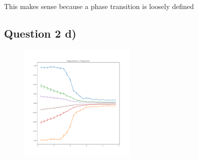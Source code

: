\documentclass[a4paper, twocolumn]{article}
\begin{document}
This makes sense because a phase transition is loosely defined %



\subsection*{Question 2 d)}
\begin{figure}
    \centering
    \includegraphics[width=0.5\textwidth]{pub/figures/magnetisation_ising_2d.pdf}
    \caption{}
    \label{fig:8}
\end{figure}
\end{document}
